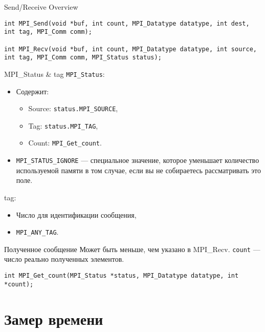 \begin{frame}[fragile]{Send/Receive Overview}
\begin{lstlisting}
int MPI_Send(void *buf, int count, MPI_Datatype datatype, int dest, int tag, MPI_Comm comm);

int MPI_Recv(void *buf, int count, MPI_Datatype datatype, int source, int tag, MPI_Comm comm, MPI_Status status);
\end{lstlisting}
\end{frame}

\begin{frame}{MPI_Status \& tag}
\texttt{MPI_Status}:

\begin{itemize}
    \item Содержит:
    \begin{itemize}
        \item Source: \texttt{status.MPI_SOURCE},
        \item Tag:  \texttt{status.MPI_TAG},
        \item Count: \texttt{MPI_Get_count}.
    \end{itemize}
    \item \texttt{MPI_STATUS_IGNORE} --- специальное значение, которое уменьшает количество используемой памяти в том случае, если вы не собираетесь рассматривать это поле.
\end{itemize}
\vfill
tag:
\begin{itemize}
    \item Число для идентификации сообщения,
    \item \texttt{MPI_ANY_TAG}.
\end{itemize}
\end{frame}

\begin{frame}[fragile]{Полученное сообщение}
Может быть меньше, чем указано в MPI_Recv.
\vfill
\texttt{count} --- число реально полученных элементов.
\vfill
\begin{lstlisting}
int MPI_Get_count(MPI_Status *status, MPI_Datatype datatype, int *count);
\end{lstlisting}
\end{frame}

\section{Замер времени}

